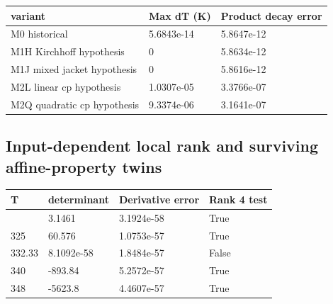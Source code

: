 \documentclass[
  11pt,
]{article}
\begin{document}
\begingroup\footnotesize

\begin{longtable}[]{@{}lll@{}}
\toprule\noalign{}
variant & Max dT (K) & Product decay error \\
\midrule\noalign{}
\endhead
\bottomrule\noalign{}
\endlastfoot
M0 historical & 5.6843e-14 & 5.8647e-12 \\
M1H Kirchhoff hypothesis & 0 & 5.8634e-12 \\
M1J mixed jacket hypothesis & 0 & 5.8616e-12 \\
M2L linear cp hypothesis & 1.0307e-05 & 3.3766e-07 \\
M2Q quadratic cp hypothesis & 9.3374e-06 & 3.1641e-07 \\
\end{longtable}

\endgroup

\hypertarget{input-dependent-local-rank-and-surviving-affine-property-twins}{%
\subsection{Input-dependent local rank and surviving affine-property
twins}\label{input-dependent-local-rank-and-surviving-affine-property-twins}}

\begingroup\footnotesize

\begin{longtable}[]{@{}llll@{}}
\toprule\noalign{}
T & determinant & Derivative error & Rank 4 test \\
\midrule\noalign{}
\endhead
\bottomrule\noalign{}
\endlastfoot
315 & 3.1461 & 3.1924e-58 & True \\
325 & 60.576 & 1.0753e-57 & True \\
332.33 & 8.1092e-58 & 1.8484e-57 & False \\
340 & -893.84 & 5.2572e-57 & True \\
348 & -5623.8 & 4.4607e-57 & True \\
\end{longtable}

\endgroup

\begingroup\footnotesize
\end{document}
